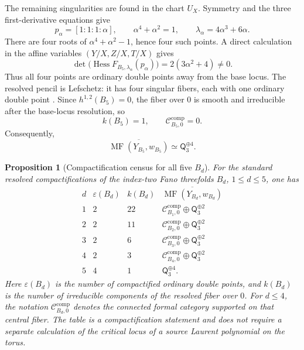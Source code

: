 \documentclass[11pt]{amsart}
\newtheorem{proposition}[theorem]{Proposition}
\theoremstyle{definition}
\theoremstyle{remark}
\DeclareMathOperator{\MF}{MF}
\newcommand{\MorseCat}[1]{\mathsf{Q}_{#1}}
\newcommand{\CcompB}{\mathcal C^{\mathrm{comp}}_{B_4,0}}
\newcommand{\CcompBtwo}{\mathcal C^{\mathrm{comp}}_{B_2,0}}
\newcommand{\CcompBthree}{\mathcal C^{\mathrm{comp}}_{B_3,0}}
\newcommand{\CcompBone}{\mathcal C^{\mathrm{comp}}_{B_1,0}}
\begin{document}
The remaining singularities are found in the chart $U_X$.  Symmetry and the
three first-derivative equations give
\begin{equation}
\label{eq:B5_compact_nodes}
p_\alpha=[1:1:1:\alpha],
\qquad
\alpha^4+\alpha^2=1,
\qquad
\lambda_\alpha=4\alpha^3+6\alpha.
\end{equation}
There are four roots of $\alpha^4+\alpha^2-1$, hence four such points.  A
direct calculation in the affine variables $(Y/X,Z/X,T/X)$ gives
\begin{equation}
\label{eq:B5_compact_hessian}
\det\bigl(\operatorname{Hess}F_{B_5,\lambda_\alpha}
(p_\alpha)\bigr)
=2(3\alpha^2+4)\neq0.
\end{equation}
Thus all four points are ordinary double points away from the base locus.
The resolved pencil is Lefschetz: it has four singular fibers, each with one
ordinary double point \cite{Przyjalkowski2026}.  Since
$h^{1,2}(B_5)=0$, the fiber over $0$ is smooth and irreducible after the
base-locus resolution, so
\begin{equation}
\label{eq:B5_component_count}
k(B_5)=1,
\qquad
\mathcal C^{\mathrm{comp}}_{B_5,0}=0.
\end{equation}
Consequently,
\begin{equation}
\label{eq:B5_compact_final_decomposition}
\overline{\MF(Y_{B_5},w_{B_5})}
\simeq
\MorseCat{3}^{\oplus4}.
\end{equation}

\begin{proposition}[Compactification census for all five $B_d$]
\label{prop:Bd_compactification_census}
For the standard resolved compactifications of the index-two Fano
threefolds $B_d$, $1\leq d\leq5$, one has
\[
\begin{array}{c|c|c|c}
d & \varepsilon(B_d) & k(B_d) &
\overline{\MF(Y_{B_d},w_{B_d})} \\
\hline
1 & 2 & 22 & \CcompBone\oplus\MorseCat{3}^{\oplus2} \\
2 & 2 & 11 & \CcompBtwo\oplus\MorseCat{3}^{\oplus2} \\
3 & 2 & 6  & \CcompBthree\oplus\MorseCat{3}^{\oplus2} \\
4 & 2 & 3  & \CcompB\oplus\MorseCat{3}^{\oplus2} \\
5 & 4 & 1  & \MorseCat{3}^{\oplus4}.
\end{array}
\]
Here $\varepsilon(B_d)$ is the number of compactified ordinary double
points, and $k(B_d)$ is the number of irreducible components of the resolved
fiber over $0$.  For $d\leq4$, the notation $\mathcal C^{\mathrm{comp}}_{B_d,0}$
denotes the connected formal category supported on that central fiber.  The
table is a compactification statement and does not require a separate
calculation of the critical locus of a source Laurent polynomial on the
torus.
\end{proposition}
\end{document}
